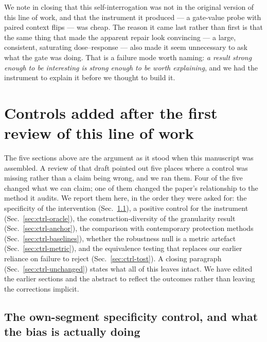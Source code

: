 \documentclass[10pt]{article}
\begin{document}
We note in closing that this self-interrogation was not in the original
version of this line of work, and that the instrument it produced --- a
gate-value probe with paired context flips --- was cheap. The reason it
came last rather than first is that the same thing that made the
apparent repair look convincing --- a large, consistent, saturating
dose--response --- also made it seem unnecessary to ask what the gate was
doing. That is a failure mode worth naming: \emph{a result strong enough
to be interesting is strong enough to be worth explaining}, and we had
the instrument to explain it before we thought to build it.





\section{Controls added after the first review of this line of work}
\label{sec:controls}

The five sections above are the argument as it stood when this manuscript
was assembled. A review of that draft pointed out five places where a
control was missing rather than a claim being wrong, and we ran them. Four
of the five changed what we can claim; one of them changed the paper's
relationship to the method it audits. We report them here, in the order
they were asked for: the specificity of the intervention
(Sec.~\ref{sec:ctrl-specificity}), a positive control for the instrument
(Sec.~\ref{sec:ctrl-oracle}), the construction-diversity of the
granularity result (Sec.~\ref{sec:ctrl-anchor}), the comparison with
contemporary protection methods (Sec.~\ref{sec:ctrl-baselines}), whether
the robustness null is a metric artefact (Sec.~\ref{sec:ctrl-metric}), and
the equivalence testing that replaces our earlier reliance on failure to
reject (Sec.~\ref{sec:ctrl-tost}). A closing paragraph
(Sec.~\ref{sec:ctrl-unchanged}) states what all of this leaves intact. We
have edited the earlier sections and the abstract to reflect the outcomes
rather than leaving the corrections implicit.

\subsection{The own-segment specificity control, and what the bias is
actually doing}
\label{sec:ctrl-specificity}
\end{document}
